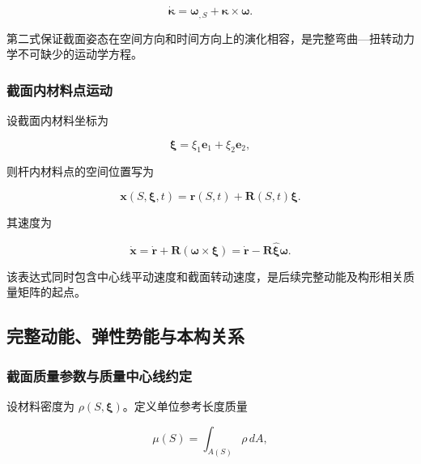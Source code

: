 \begin{equation}
\label{eq:rod-1-19}
\dot{\bm{\kappa}} = \bm{\omega}_{,S} + \bm{\kappa} \times \bm{\omega}.
\end{equation}

第二式保证截面姿态在空间方向和时间方向上的演化相容，是完整弯曲---扭转动力学不可缺少的运动学方程。

\subsubsection{截面内材料点运动}\label{sec:rod-1-2-6}

设截面内材料坐标为

\begin{equation}
\label{eq:rod-1-20}
\bm{\xi} = \xi_{1}\mathbf{e}_{1} + \xi_{2}\mathbf{e}_{2},
\end{equation}

则杆内材料点的空间位置写为

\begin{equation}
\label{eq:rod-1-21}
\mathbf{x}\left( S,\bm{\xi},t \right) = \mathbf{r}(S,t) + \mathbf{R}(S,t)\bm{\xi}.
\end{equation}

其速度为

\begin{equation}
\label{eq:rod-1-22}
\dot{\mathbf{x}} = \dot{\mathbf{r}} + \mathbf{R}\left( \bm{\omega} \times \bm{\xi} \right) = \dot{\mathbf{r}} - \mathbf{R}\widehat{\bm{\xi}}\bm{\omega}.
\end{equation}

该表达式同时包含中心线平动速度和截面转动速度，是后续完整动能及构形相关质量矩阵的起点。

\subsection{完整动能、弹性势能与本构关系}\label{sec:rod-1-3}

\subsubsection{截面质量参数与质量中心线约定}\label{sec:rod-1-3-1}

设材料密度为 \(\rho\left( S,\bm{\xi} \right)\)。定义单位参考长度质量

\begin{equation}
\label{eq:rod-1-23}
\mu(S) = \int_{A(S)}^{}\rho\, dA,
\end{equation}


